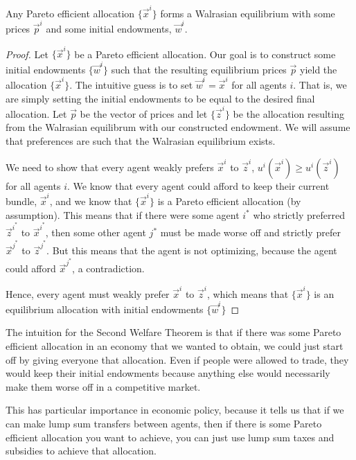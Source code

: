 \begin{theorem*}
    Any Pareto efficient allocation $\{\vec{x}^i\}$ forms a Walrasian equilibrium with some prices $\vec{p}^i$ and some initial endowments, $\vec{w}^i$.
\end{theorem*}
\begin{proof}
    Let $\{\vec{x}^i\}$ be a Pareto efficient allocation. Our goal is to construct some initial endowments $\{\vec{w}^i\}$ such that the resulting equilibrium prices $\vec{p}$ yield the allocation $\{\vec{x}^i\}$. The intuitive guess is to set $\vec{w}^i = \vec{x}^i$ for all agents $i$. That is, we are simply setting the initial endowments to be equal to the desired final allocation. Let $\vec{p}$ be the vector of prices and let $\{\vec{z}^i\}$ be the allocation resulting from the Walrasian equilibrum with our constructed endowment. We will assume that preferences are such that the Walrasian equilibrium exists.

    We need to show that every agent weakly prefers $\vec{x}^i$ to $\vec{z}^i$, $u^i(\vec{x}^i) \geq u^i(\vec{z}^i)$ for all agents $i$. We know that every agent could afford to keep their current bundle, $\vec{x}^i$, and we know that $\{\vec{x}^i\}$ is a Pareto efficient allocation (by assumption). This means that if there were some agent $i^*$ who strictly preferred $\vec{z}^{i^*}$ to $\vec{x}^{i^*}$, then some other agent $j^*$ must be made worse off and strictly prefer $\vec{x}^{j^*}$ to $\vec{z}^{j^*}$. But this means that the agent is not optimizing, because the agent could afford $\vec{x}^{j^*}$, a contradiction. 

    Hence, every agent must weakly prefer $\vec{x}^i$ to $\vec{z}^i$, which means that $\{\vec{x}^i\}$ is an equilibrium allocation with initial endowments $\{\vec{w}^i\}$
\end{proof}
The intuition for the Second Welfare Theorem is that if there was some Pareto efficient allocation in an economy that we wanted to obtain, we could just start off by giving everyone that allocation. Even if people were allowed to trade, they would keep their initial endowments because anything else would necessarily make them worse off in a competitive market.

This has particular importance in economic policy, because it tells us that if we can make lump sum transfers between agents, then if there is some Pareto efficient allocation you want to achieve, you can just use lump sum taxes and subsidies to achieve that allocation.

